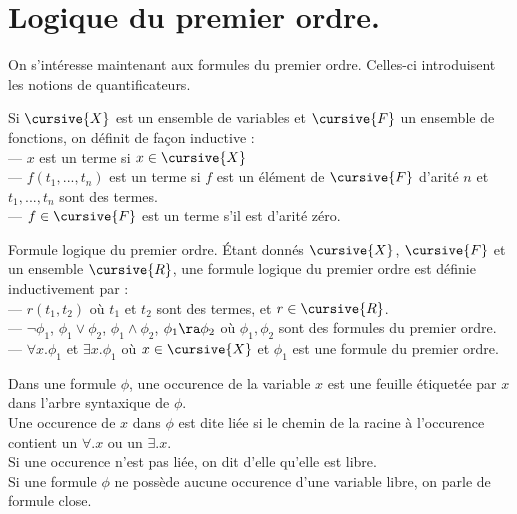 \documentclass[french, 11pt]{article}
\begin{document}
\section{Logique du premier ordre.}

\renewcommand*{\X}{\cursive{X}}
\renewcommand*{\F}{\cursive{F}}
\renewcommand*{\R}{\cursive{R}}

On s'intéresse maintenant aux formules du premier ordre. Celles-ci introduisent les notions de quantificateurs.

Si $\X$ est un ensemble de variables et $\F$ un ensemble de fonctions, on définit de façon inductive :\\
--- $x$ est un terme si $x\in\X$\\
--- $f(t_1,...,t_n)$ est un terme si $f$ est un élément de $\F$ d'arité $n$ et $t_1,...,t_n$ sont des termes.\\
--- $f\in\F$ est un terme s'il est d'arité zéro.

\begin{defi}{Formule logique du premier ordre.}{}
    Étant donnés $\X$, $\F$ et un ensemble $\R$, une formule logique du premier ordre est définie inductivement par :\\
    --- $r(t_1,t_2)$ où $t_1$ et $t_2$ sont des termes, et $r\in\R$.\\
    --- $\lnot\phi_1$, $\phi_1\lor\phi_2$, $\phi_1\land\phi_2$, $\phi_1\ra\phi_2$ où $\phi_1,\phi_2$ sont des formules du premier ordre.\\
    --- $\forall x.\phi_1$ et $\exists x.\phi_1$ où $x\in\X$ et $\phi_1$ est une formule du premier ordre. 
\end{defi}

\vspace*{-0.8cm}

\begin{defi}{}{}
    Dans une formule $\phi$, une occurence de la variable $x$ est une feuille étiquetée par $x$ dans l'arbre syntaxique de $\phi$.\\
    Une occurence de $x$ dans $\phi$ est dite liée si le chemin de la racine à l'occurence contient un $\forall.x$ ou un $\exists.x$.\\
    Si une occurence n'est pas liée, on dit d'elle qu'elle est libre.\\
    Si une formule $\phi$ ne possède aucune occurence d'une variable libre, on parle de formule close.
\end{defi}

\vspace*{-0.8cm}
\end{document}
